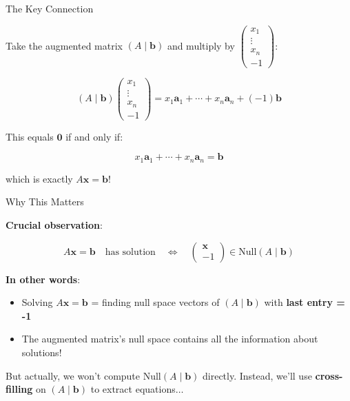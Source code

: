 \documentclass[10pt]{beamer}
\theoremstyle{definition}
\newcommand{\x}[1]{\alert{\textbf{#1}}}
\begin{document}
\begin{frame}{The Key Connection}

Take the augmented matrix $(A \mid \mathbf{b})$ and multiply by $\begin{pmatrix} x_1 \\ \vdots \\ x_n \\ -1 \end{pmatrix}$:

\vspace{0.5em}

$$(A \mid \mathbf{b}) \begin{pmatrix} x_1 \\ \vdots \\ x_n \\ -1 \end{pmatrix} = x_1\mathbf{a}_1 + \cdots + x_n\mathbf{a}_n + (-1)\mathbf{b}$$

\vspace{0.5em}

This equals $\mathbf{0}$ if and only if:

$$x_1\mathbf{a}_1 + \cdots + x_n\mathbf{a}_n = \mathbf{b}$$

which is exactly $A\mathbf{x} = \mathbf{b}$!

\end{frame}

\begin{frame}{Why This Matters}

\x{Crucial observation}:

$$A\mathbf{x} = \mathbf{b} \quad\text{has solution}\quad \iff \quad \begin{pmatrix} \mathbf{x} \\ -1 \end{pmatrix} \in \text{Null}(A \mid \mathbf{b})$$

\vspace{1em}

\x{In other words}:
\begin{itemize}
\item Solving $A\mathbf{x} = \mathbf{b}$ = finding null space vectors of $(A \mid \mathbf{b})$ with \textbf{last entry = -1}
\item The augmented matrix's null space contains all the information about solutions!
\end{itemize}

\vspace{1em}

But actually, we won't compute $\text{Null}(A \mid \mathbf{b})$ directly. Instead, we'll use \x{cross-filling} on $(A \mid \mathbf{b})$ to extract equations$\ldots$

\end{frame}
\end{document}
